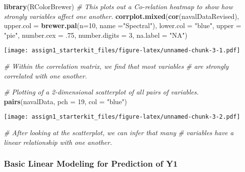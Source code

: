 \documentclass[
]{article}
\newenvironment{Shaded}{\begin{snugshade}}{\end{snugshade}}
\newcommand{\CommentTok}[1]{\textcolor[rgb]{0.56,0.35,0.01}{\textit{#1}}}
\newcommand{\DataTypeTok}[1]{\textcolor[rgb]{0.13,0.29,0.53}{#1}}
\newcommand{\DecValTok}[1]{\textcolor[rgb]{0.00,0.00,0.81}{#1}}
\newcommand{\FloatTok}[1]{\textcolor[rgb]{0.00,0.00,0.81}{#1}}
\newcommand{\KeywordTok}[1]{\textcolor[rgb]{0.13,0.29,0.53}{\textbf{#1}}}
\newcommand{\NormalTok}[1]{#1}
\newcommand{\StringTok}[1]{\textcolor[rgb]{0.31,0.60,0.02}{#1}}
\begin{document}
\begin{Shaded}
\begin{Highlighting}[]
\KeywordTok{library}\NormalTok{(RColorBrewer)}
\CommentTok{# This plots out a Co-relation heatmap to show how strongly variables affect one another.}
\KeywordTok{corrplot.mixed}\NormalTok{(}\KeywordTok{cor}\NormalTok{(navalDataRevised), }\DataTypeTok{upper.col =} \KeywordTok{brewer.pal}\NormalTok{(}\DataTypeTok{n=}\DecValTok{10}\NormalTok{, }\DataTypeTok{name =}\StringTok{"Spectral"}\NormalTok{),}
               \DataTypeTok{lower.col =} \StringTok{"blue"}\NormalTok{, }\DataTypeTok{upper =} \StringTok{"pie"}\NormalTok{, }\DataTypeTok{number.cex =} \FloatTok{.75}\NormalTok{, }\DataTypeTok{number.digits =} \DecValTok{3}\NormalTok{, }\DataTypeTok{na.label =} \StringTok{"NA"}\NormalTok{)}
\end{Highlighting}
\end{Shaded}

\texttt{[image: assign1\_starterkit\_files/figure-latex/unnamed-chunk-3-1.pdf]}

\begin{Shaded}
\begin{Highlighting}[]
\CommentTok{# Within the correlation matrix, we find that most variables}
\CommentTok{# are strongly correlated with one another.}


\CommentTok{# Plotting of a 2-dimensional scatterplot of all pairs of variables.}
\KeywordTok{pairs}\NormalTok{(navalData, }\DataTypeTok{pch =} \DecValTok{19}\NormalTok{, }\DataTypeTok{col =} \StringTok{"blue"}\NormalTok{) }
\end{Highlighting}
\end{Shaded}

\texttt{[image: assign1\_starterkit\_files/figure-latex/unnamed-chunk-3-2.pdf]}

\begin{Shaded}
\begin{Highlighting}[]
\CommentTok{# After looking at the scatterplot, we can infer that many }
\CommentTok{# variables have a linear relationship with one another. }
\end{Highlighting}
\end{Shaded}

\hypertarget{basic-linear-modeling-for-prediction-of-y1}{%
\subsubsection{Basic Linear Modeling for Prediction of
Y1}\label{basic-linear-modeling-for-prediction-of-y1}}
\end{document}
